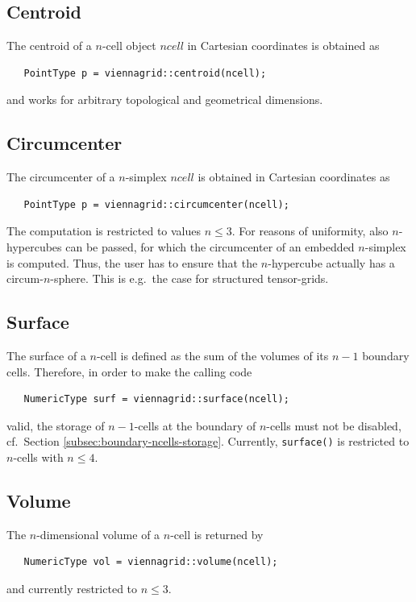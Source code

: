   \subsection{Centroid}
  The centroid of a $n$-cell object $ncell$ in Cartesian coordinates is obtained as
  \begin{lstlisting}
   PointType p = viennagrid::centroid(ncell);
  \end{lstlisting}
  and works for arbitrary topological and geometrical dimensions.

  \subsection{Circumcenter}
  The circumcenter of a $n$-simplex $ncell$ is obtained in Cartesian coordinates as
  \begin{lstlisting}
   PointType p = viennagrid::circumcenter(ncell);
  \end{lstlisting}
  The computation is restricted to values $n \leq 3$. For reasons of uniformity, also $n$-hypercubes can be passed, for which the circumcenter of an embedded $n$-simplex is computed.
  Thus, the user has to ensure that the $n$-hypercube actually has a circum-$n$-sphere. This is e.g.~the case for structured tensor-grids.


  \subsection{Surface}
  The surface of a $n$-cell is defined as the sum of the volumes of its $n-1$ boundary cells. Therefore, in order to make the calling code
  \begin{lstlisting}
   NumericType surf = viennagrid::surface(ncell);
  \end{lstlisting}
  valid, the storage of $n-1$-cells at the boundary of $n$-cells must not be disabled, cf.~Section \ref{subsec:boundary-ncells-storage}.
  Currently, \lstinline|surface()| is restricted to $n$-cells with $n \leq 4$.


  \subsection{Volume}
  The $n$-dimensional volume of a $n$-cell is returned by
  \begin{lstlisting}
   NumericType vol = viennagrid::volume(ncell);
  \end{lstlisting}
  and currently restricted to $n \leq 3$.



